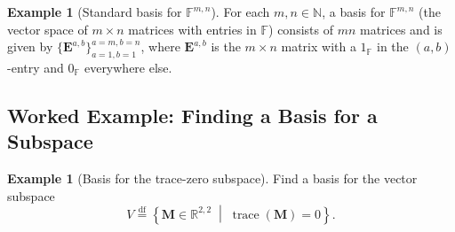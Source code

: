 \documentclass[11pt, a4paper, notitlepage]{report}
\theoremstyle{definition}
\newtheorem{example}[theorem]{Example}
\theoremstyle{remark}
\begin{document}
\begin{example}[Standard basis for $\mathbb{F}^{m,n}$]\label{ex:standard-basis-Fmn}
For each $m, n\in\mathbb{N}$, a basis for $\mathbb{F}^{m,n}$ (the vector space of $m\times n$ matrices with entries in $\mathbb{F}$) consists of $mn$ matrices and is given by $\{\mathbf{E}^{a,b}\}_{a=1,b=1}^{a=m,b=n}$, where $\mathbf{E}^{a,b}$ is the $m\times n$ matrix with a $1_\mathbb{F}$ in the $(a,b)$-entry and $0_\mathbb{F}$ everywhere else.
\end{example}

\subsection{Worked Example: Finding a Basis for a Subspace}

\begin{example}[Basis for the trace-zero subspace]\label{ex:trace-zero-basis}
Find a basis for the vector subspace
\[
  V \stackrel{\mathrm{df}}{=} \left\{ \mathbf{M}\in\mathbb{R}^{2,2} \;\middle|\; \operatorname{trace}(\mathbf{M}) = 0 \right\}.
\]


\end{example}
\end{document}
